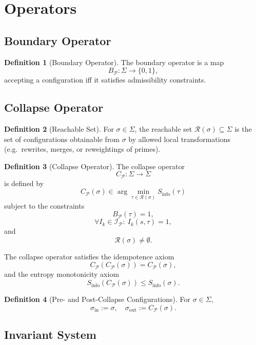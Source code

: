 \documentclass[12pt]{article}
\theoremstyle{definition}
\newtheorem{definition}{Definition}[section]
\theoremstyle{plain}
\begin{document}
\section{Operators}

\subsection{Boundary Operator}

\begin{definition}[Boundary Operator]
The boundary operator is a map
\[
B_{\mathcal{P}} : \Sigma \to \{0,1\},
\]
accepting a configuration iff it satisfies admissibility constraints.
\end{definition}

\subsection{Collapse Operator}

\begin{definition}[Reachable Set]
For \(\sigma \in \Sigma\), the reachable set \(\mathcal{R}(\sigma) \subseteq \Sigma\) is the set of configurations obtainable from \(\sigma\) by allowed local transformations (e.g.\ rewrites, merges, or reweightings of primes).
\end{definition}

\begin{definition}[Collapse Operator]
The collapse operator
\[
C_{\mathcal{P}} : \Sigma \to \Sigma
\]
is defined by
\[
C_{\mathcal{P}}(\sigma) \in \arg\min_{\tau \in \mathcal{R}(\sigma)}
S_{\mathrm{info}}(\tau)
\]
subject to the constraints
\[
B_{\mathcal{P}}(\tau) = 1,
\]
\[
\forall I_k \in \mathcal{I}_{\mathcal{P}}:\ I_k(s,\tau) = 1,
\]
and
\[
\mathcal{R}(\sigma) \neq \emptyset.
\]

The collapse operator satisfies the idempotence axiom
\[
C_{\mathcal{P}}(C_{\mathcal{P}}(\sigma)) = C_{\mathcal{P}}(\sigma),
\]
and the entropy monotonicity axiom
\[
S_{\mathrm{info}}(C_{\mathcal{P}}(\sigma)) \le S_{\mathrm{info}}(\sigma).
\]
\end{definition}

\begin{definition}[Pre- and Post-Collapse Configurations]
For \(\sigma \in \Sigma\),
\[
\sigma_{\mathrm{in}} := \sigma, \quad
\sigma_{\mathrm{out}} := C_{\mathcal{P}}(\sigma).
\]
\end{definition}

\subsection{Invariant System}
\end{document}
